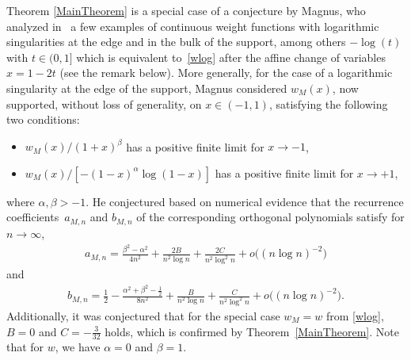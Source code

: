 Theorem \ref{MainTheorem} is a special case of a conjecture by Magnus, who analyzed in~\cite{Mag18} a few examples of continuous weight functions with logarithmic singularities at the edge and in the bulk of the support, among others $-\log(t)$ with $t \in (0, 1]$ which is equivalent to~\eqref{wlog} after the affine change of variables $x = 1-2t$ (see the remark below). More generally, for the case of a logarithmic singularity at the edge of the support, Magnus considered $w_M(x)$, now supported, without loss of generality, on $x \in (-1,1)$, satisfying the following two conditions:
\begin{itemize}\itemsep=0pt
 \item $w_M(x)/(1+x)^{\beta}$ has a positive finite limit for $x \to -1$,
 \item $w_M(x)/[-(1-x)^{\alpha}\log(1-x)]$ has a positive finite limit for $x \to +1$,
\end{itemize}
where $\alpha, \beta > -1$. He conjectured based on numerical evidence that the recurrence coefficients~$a_{M,n}$ and $b_{M,n}$ of the corresponding orthogonal polynomials satisfy for $n \to \infty$,
\begin{align}\label{MagA}
 a_{M,n} = \frac{\beta^2-\alpha^2}{4n^2} + \frac{2B}{n^2\log n} + \frac{2C}{n^2 \log^2 n} + o\big((n \log n)^{-2}\big)
\end{align}
and
\begin{align}\label{MagB}
 b_{M,n} = \frac{1}{2} - \frac{\alpha^2 +\beta^2-\frac{1}{2}}{8n^2} + \frac{B}{n^2 \log n} + \frac{C}{n^2 \log^2 n} + o\big((n \log n)^{-2}\big).
\end{align}
Additionally, it was conjectured that for the special case $w_M = w$ from \eqref{wlog}, $B = 0$ and $C = -\frac{3}{32}$ holds, which is confirmed by Theorem~\ref{MainTheorem}. Note that for $w$, we have $\alpha = 0$ and $\beta = 1$.
